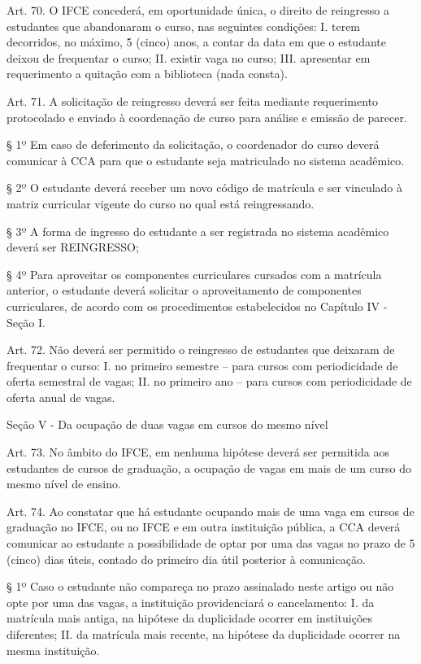 \documentclass{paper}
\begin{document}
Art. 70. O IFCE concederá, em oportunidade única, o direito de reingresso a estudantes que abandonaram o curso, nas seguintes condições:
I. terem decorridos, no máximo, 5 (cinco) anos, a contar da data em que o estudante deixou de frequentar o curso;
II. existir vaga no curso;
III. apresentar em requerimento a quitação com a biblioteca (nada consta).

Art. 71. A solicitação de reingresso deverá ser feita mediante requerimento protocolado e enviado à coordenação de curso para análise e emissão de parecer.

§ 1º Em caso de deferimento da solicitação, o coordenador do curso deverá comunicar à CCA para que o estudante seja matriculado no sistema acadêmico.

§ 2º O estudante deverá receber um novo código de matrícula e ser vinculado à matriz curricular vigente do curso no qual está reingressando.

§ 3º A forma de ingresso do estudante a ser registrada no sistema acadêmico deverá ser REINGRESSO;

§ 4º Para aproveitar os componentes curriculares cursados com a matrícula anterior, o estudante deverá solicitar o aproveitamento de componentes curriculares, de acordo com os procedimentos estabelecidos no Capítulo IV - Seção I.

Art. 72. Não deverá ser permitido o reingresso de estudantes que deixaram de frequentar o curso:
I. no primeiro semestre – para cursos com periodicidade de oferta semestral de vagas;
II. no primeiro ano – para cursos com periodicidade de oferta anual de vagas.

\begin{center}
Seção V - Da ocupação de duas vagas em cursos do mesmo nível
\end{center}   

Art. 73. No âmbito do IFCE, em nenhuma hipótese deverá ser permitida aos estudantes de cursos de graduação, a ocupação de vagas em mais de um curso do mesmo nível de ensino.

Art. 74. Ao constatar que há estudante ocupando mais de uma vaga em cursos de graduação no IFCE, ou no IFCE e em outra instituição pública, a CCA deverá comunicar ao estudante a possibilidade de optar por uma das vagas no prazo de 5 (cinco) dias úteis, contado do primeiro dia útil posterior à comunicação.

§ 1º Caso o estudante não compareça no prazo assinalado neste artigo ou não opte por uma das vagas, a instituição providenciará o cancelamento:
I. da matrícula mais antiga, na hipótese da duplicidade ocorrer em instituições diferentes;
II. da matrícula mais recente, na hipótese da duplicidade ocorrer na mesma instituição.
\end{document}
